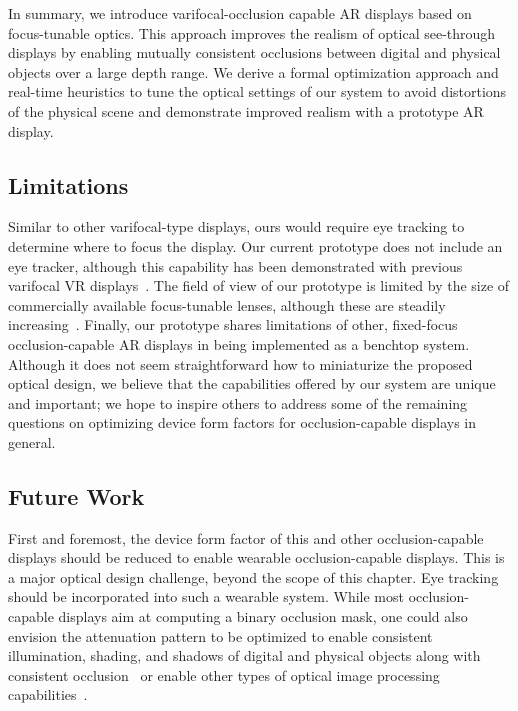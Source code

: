 In summary, we introduce varifocal-occlusion capable AR displays based on focus-tunable optics. This approach improves the realism of optical see-through displays by enabling mutually consistent occlusions between digital and physical objects over a large depth range. We derive a formal optimization approach and real-time heuristics to tune the optical settings of our system to avoid distortions of the physical scene and demonstrate improved realism with a prototype AR display. 

\subsection{Limitations}

Similar to other varifocal-type displays, ours would require eye tracking to determine where to focus the display. Our current prototype does not include an eye tracker, although this capability has been demonstrated with previous varifocal VR displays~\cite{Padmanaban2016Optimizing}. The field of view of our prototype is limited by the size of commercially available focus-tunable lenses, although these are steadily increasing~\cite{Padmanaban2019Autofocals}. Finally, our prototype shares limitations of other, fixed-focus occlusion-capable AR displays in being implemented as a benchtop system. Although it does not seem straightforward how to miniaturize the proposed optical design, we believe that the capabilities offered by our system are unique and important; we hope to inspire others to address some of the remaining questions on optimizing device form factors for occlusion-capable displays in general. 

\subsection{Future Work}

First and foremost, the device form factor of this and other occlusion-capable displays should be reduced to enable wearable occlusion-capable displays. This is a major optical design challenge, beyond the scope of this chapter. Eye tracking should be incorporated into such a wearable system. While most occlusion-capable displays aim at computing a binary occlusion mask, one could also envision the attenuation pattern to be optimized to enable consistent illumination, shading, and shadows of digital and physical objects along with consistent occlusion~\cite{bimber2003consistent} or enable other types of optical image processing capabilities~\cite{Wetzstein2010}. 


